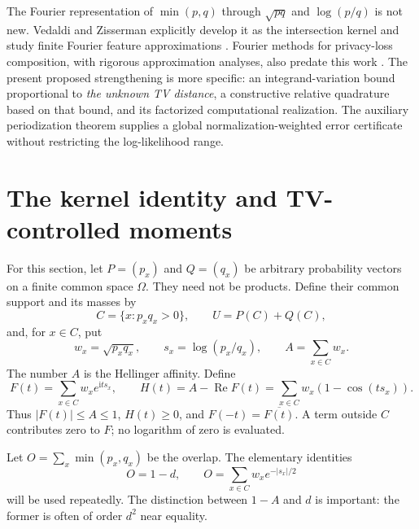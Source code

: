 \documentclass[11pt]{article}
\theoremstyle{definition}
\theoremstyle{remark}
\DeclareMathOperator{\Rea}{Re}
\newcommand{\ii}{\mathrm i}
\begin{document}
The Fourier representation of $\min(p,q)$ through $\sqrt{pq}$ and $\log(p/q)$ is not new. Vedaldi and Zisserman explicitly develop it as the intersection kernel and study finite Fourier feature approximations \cite{VZ10}. Fourier methods for privacy-loss composition, with rigorous approximation analyses, also predate this work \cite{KJPH21,KH21,GLW21}. The present proposed strengthening is more specific: an integrand-variation bound proportional to \emph{the unknown TV distance}, a constructive relative quadrature based on that bound, and its factorized computational realization. The auxiliary periodization theorem supplies a global normalization-weighted error certificate without restricting the log-likelihood range.

\section{The kernel identity and TV-controlled moments}
\label{sec:kernel}

For this section, let $P=(p_x)$ and $Q=(q_x)$ be arbitrary probability vectors on a finite common space $\Omega$. They need not be products. Define their common support and its masses by
\[
 C=\{x:p_xq_x>0\},\qquad U=P(C)+Q(C),
\]
and, for $x\in C$, put
\begin{equation}
 w_x=\sqrt{p_xq_x},\qquad s_x=\log(p_x/q_x),\qquad
 A=\sum_{x\in C}w_x.
 \label{eq:weights}
\end{equation}
The number $A$ is the Hellinger affinity. Define
\begin{equation}
 F(t)=\sum_{x\in C}w_x e^{\ii t s_x},\qquad
 H(t)=A-\Rea F(t)=\sum_{x\in C}w_x(1-\cos(ts_x)).
 \label{eq:transform}
\end{equation}
Thus $|F(t)|\le A\le1$, $H(t)\ge0$, and $F(-t)=\overline{F(t)}$.
A term outside $C$ contributes zero to $F$; no logarithm of zero is evaluated.

Let $O=\sum_x\min(p_x,q_x)$ be the overlap. The elementary identities
\begin{equation}
 O=1-d,\qquad
 O=\sum_{x\in C}w_x e^{-|s_x|/2}
 \label{eq:overlap}
\end{equation}
will be used repeatedly. The distinction between $1-A$ and $d$ is important: the former is often of order $d^2$ near equality.
\end{document}
